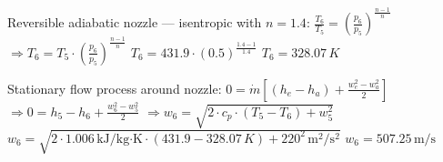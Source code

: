 Reversible adiabatic nozzle — isentropic with \( n = 1.4 \):  
\( \frac{T_6}{T_5} = \left( \frac{p_6}{p_5} \right)^{\frac{n-1}{n}} \)  
\( \Rightarrow T_6 = T_5 \cdot \left( \frac{p_6}{p_5} \right)^{\frac{n-1}{n}} \)  
\( T_6 = 431.9 \cdot \left( 0.5 \right)^{\frac{1.4-1}{1.4}} \)  
\( T_6 = 328.07 \, K \)  

Stationary flow process around nozzle:  
\( 0 = \dot{m} \left[ (h_e - h_a) + \frac{w_e^2 - w_a^2}{2} \right] \)  
\( \Rightarrow 0 = h_5 - h_6 + \frac{w_6^2 - w_5^2}{2} \)  
\( \Rightarrow w_6 = \sqrt{2 \cdot c_p \cdot (T_5 - T_6) + w_5^2} \)  
\( w_6 = \sqrt{2 \cdot 1.006 \, \text{kJ/kg·K} \cdot (431.9 - 328.07 \, K) + 220^2 \, \text{m}^2/\text{s}^2} \)  
\( w_6 = 507.25 \, \text{m/s} \)